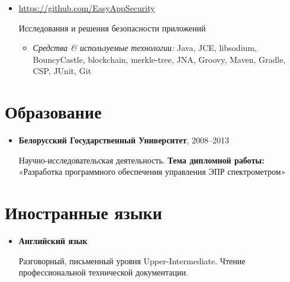 \documentclass[a4paper, 12pt]{article}
\newcommand{\position}[1]{
    \textbf{#1}}
\newcommand{\itemlabel}[1]{
    \textit{#1:}}
\begin{document}
	\begin{itemize}
        \item \href{https://github.com/EasyAppSecurity}{https://github.com/EasyAppSecurity}

Исследования и решения безопасности приложений 

            \begin{itemize}
                \item \itemlabel{Средства \& используемые технологии} Java, JCE, libsodium, BouncyCastle, blockchain, merkle-tree, JNA, Groovy, Maven, Gradle, CSP, JUnit, Git
            \end{itemize}
    \end{itemize}
            
\section*{Образование}

    \begin{itemize}

        \item \position{Белорусский Государственный Университет}, 2008--2013

            Научно-исследовательская деятельность.
             \newline\textbf{Тема дипломной работы:} 
             \newline «Разработка программного обеспечения управления ЭПР спектрометром»
    \end{itemize}
    
\section*{Иностранные языки}
 	\begin{itemize}
 		 \item \position{Английский язык}
 		 
 		 Разговорный, письменный уровня Upper-Intermediate. Чтение профессиональной технической документации.  
 	\end{itemize} 
\end{document}
